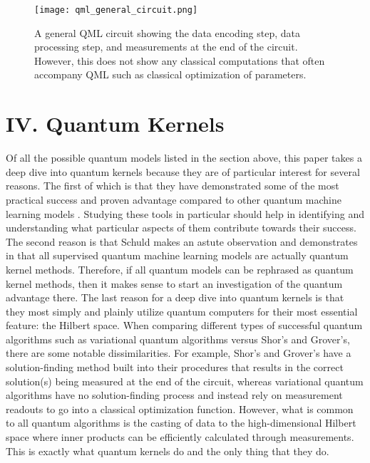 \documentclass[
	a4paper, %
	10pt, %
	unnumberedsections, %
	twoside, %
]{LTJournalArticle}
\begin{document}
\begin{figure} %
	\texttt{[image: qml\_general\_circuit.png]}
	\caption{A general QML circuit showing the data encoding step, data processing step, and measurements at the end of the circuit. However, this does not show any classical computations that
	often accompany QML such as classical optimization of parameters.}
	\label{fig:qmlgencircuit}
\end{figure}

\section{IV. Quantum Kernels}
Of all the possible quantum models listed in the section above, this paper takes a deep dive into quantum kernels because they are of particular interest for several reasons. The first of which 
is that they have demonstrated some of the most practical success and proven advantage compared to other quantum machine learning models \autocite{liu2021rigorous}. Studying these tools in 
particular should help in identifying and understanding what particular aspects of them contribute towards their success. The second reason is that Schuld makes an astute observation and 
demonstrates in \autocite{schuld2021supervised} that all supervised quantum machine learning models are actually quantum kernel methods. Therefore, if all quantum models can be rephrased as quantum kernel methods, 
then it makes sense to start an investigation of the quantum advantage there. The last reason for a deep dive into quantum kernels is that they most simply and plainly utilize quantum computers 
for their most essential feature: the Hilbert space. When comparing different types of successful quantum algorithms such as variational quantum algorithms versus Shor's and Grover's, there are 
some notable dissimilarities. For example, Shor's and Grover's have a solution-finding method built into their procedures that results in the correct solution(s) being measured at the end of 
the circuit, whereas variational quantum algorithms have no solution-finding process and instead rely on measurement readouts to go into a classical optimization function. However, what is 
common to all quantum algorithms is the casting of data to the high-dimensional Hilbert space where inner products can be efficiently calculated through measurements. This is exactly what 
quantum kernels do and the only thing that they do.
\end{document}
